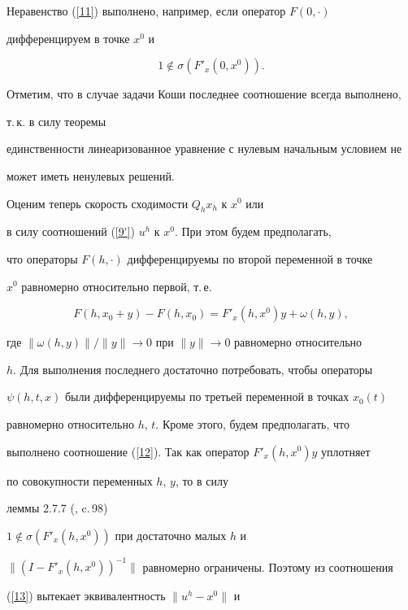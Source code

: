 Неравенство (\ref{11}) выполнено, например, если оператор $F(0,\cdot)$ 


дифференцируем в точке $x^0$ и 


\begin{equation}\label{12}


1\notin \sigma(F'_x(0, x^0)).


\end{equation} 


Отметим, что в случае задачи Коши последнее соотношение всегда выполнено,


т.\,к. в силу теоремы


единственности линеаризованное уравнение с нулевым начальным условием не 


может иметь ненулевых решений. 


 


Оценим теперь скорость сходимости $Q_h x_h$ к $x^0$ или 


в силу соотношений (\ref{9'}) $u^h$ к $x^0$. При этом будем предполагать,


что операторы $F(h, \cdot)$ дифференцируемы по второй переменной в точке


$x^0$ равномерно относительно первой, т.\,е.


\begin{equation}\label{13}


F(h,x_0+y)-F(h,x_0)=F'_x(h,x^0)y+\omega(h,y),


\end{equation}


где $\|\omega(h,y)\|/\|y\|\to 0$ при $\|y\|\to 0$ равномерно относительно


$h$. Для выполнения последнего достаточно потребовать, чтобы операторы


$\psi(h,t,x)$ были дифференцируемы по третьей переменной в точках $x_0(t)$


равномерно относительно $h$, $t$. Кроме этого, будем предполагать, что


выполнено соотношение (\ref{12}). Так как оператор $F'_x(h,x^0)y$ уплотняет 


по совокупности переменных $h$, $y$, то в силу 


леммы 2.7.7 (\cite{5}, c.\,98) 


$1\notin \sigma(F'_x(h, x^0))$ при достаточно малых $h$ и 


$\|(I-F'_x(h, x^0))^{-1}\|$ равномерно ограничены. Поэтому из соотношения


(\ref{13}) вытекает эквивалентность $\|u^h - x^0\|$ и 


